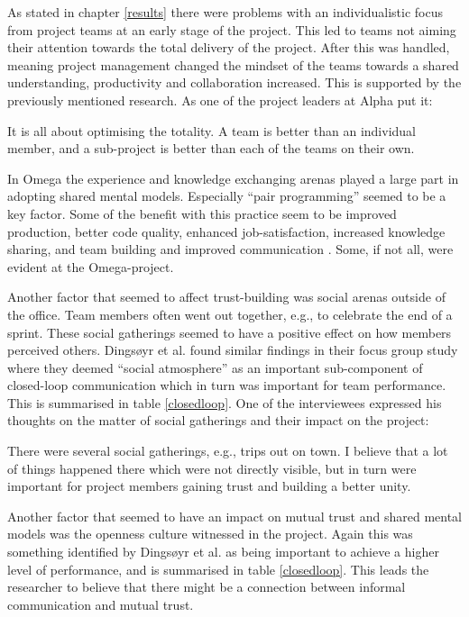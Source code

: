 As stated in chapter \ref{results} there were problems with an individualistic focus from project teams at an early stage of the project. This led to teams not aiming their attention towards the total delivery of the project. After this was handled, meaning project management changed the mindset of the teams towards a shared understanding, productivity and collaboration increased. This is supported by the previously mentioned research. As one of the project leaders at Alpha put it:

\begin{fancyquotes}
It is all about optimising the totality. A team is better than an individual member, and a sub-project is better than each of the teams on their own.
\end{fancyquotes}

In Omega the experience and knowledge exchanging arenas played a large part in adopting shared mental models. Especially ``pair programming'' seemed to be a key factor. Some of the benefit with this practice seem to be improved production, better code quality, enhanced job-satisfaction, increased knowledge sharing, and team building and improved communication \cite{Cockburn2001, Padberg2003}. Some, if not all, were evident at the Omega-project.

Another factor that seemed to affect trust-building was social arenas outside of the office. Team members often went out together, e.g., to celebrate the end of a sprint. These social gatherings seemed to have a positive effect on how members perceived others. Dingsøyr et al. \cite{Dingsoyr2013c} found similar findings in their focus group study where they deemed ``social atmosphere'' as an important sub-component of closed-loop communication which in turn was important for team performance. This is summarised in table \ref{closedloop}. One of the interviewees expressed his thoughts on the matter of social gatherings and their impact on the project:

\begin{fancyquotes}
There were several social gatherings, e.g., trips out on town. I believe that a lot of things happened there which were not directly visible, but in turn were important for project members gaining trust and building a better unity.
\end{fancyquotes}

Another factor that seemed to have an impact on mutual trust and shared mental models was the openness culture witnessed in the project. Again this was something identified by Dingsøyr et al. \cite{Dingsoyr2013c} as being important to achieve a higher level of performance, and is summarised in table \ref{closedloop}. This leads the researcher to believe that there might be a connection between informal communication and mutual trust.

